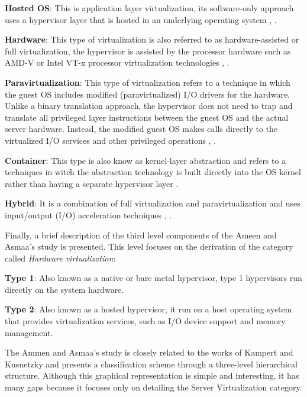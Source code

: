     \textbf{Hosted OS}: This is application layer virtualization, its software-only approach uses a hypervisor layer that is hosted in an underlying operating system \cite{Ameen2013}, \cite{VonHagen2008}.

    \textbf{Hardware}: This type of virtualization  is also referred to as hardware-assisted or full virtualization, the hypervisor is assisted by the processor hardware such as AMD-V or Intel VT-x processor virtualization technologies \cite{Ameen2013}, \cite{VonHagen2008}.

    \textbf{Paravirtualization}: This type of virtualization refers to a technique in which the guest OS includes modified (paravirtualized) I/O drivers for the hardware. Unlike a binary translation approach, the hypervisor does not need to trap and translate all privileged layer instructions between the guest OS and the actual server hardware. Instead, the modified guest OS makes calls directly to the virtualized I/O services and other privileged operations \cite{Ameen2013}, \cite{VonHagen2008}.

    \textbf{Container}: This type is also know as kernel-layer abstraction and refers to a techniques in witch the abstraction technology is built directly into the OS kernel rather than having a separate hypervisor layer \cite{Ameen2013} \cite{Lin2012}. 

    \textbf{Hybrid}: It is a combination of full virtualization and paravirtualization and uses input/output (I/O) acceleration techniques \cite{Ameen2013}, \cite{White2010}.

    Finally, a brief description of the third level components of the Ameen and Asmaa's study is presented. This level focuses on the derivation of the category called \textit{Hardware virtualization}:


    \textbf{Type 1}: Also known as a native or bare metal hypervisor, type 1 hypervisors run directly on the system hardware. 

    \textbf{Type 2}: Also known as a hosted hypervisor, it run on a host operating system that provides virtualization services, such as I/O device support and memory management. \cite{Ameen2013}
    
    The Ammen and Asmaa's study is closely related to the works of Kampert \cite{Kampert2010} and Kusnetzky \cite{Kusnetzky2011} and presents a classification scheme through a three-level hierarchical structure. Although this graphical representation is simple and interesting, it has many gaps because it focuses only on detailing the Server Virtualization category.



